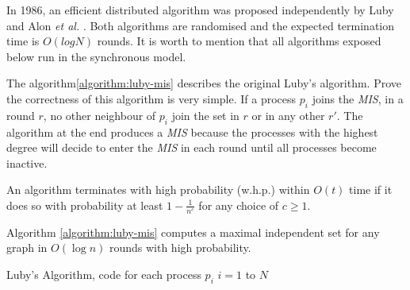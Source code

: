 In 1986, an efficient distributed algorithm was proposed independently by Luby \cite{luby1986simple} and Alon \textit{et al.} \cite{alon1986fast}. Both algorithms are randomised and the expected termination time is $O(log N)$ rounds. It is worth to mention that all algorithms exposed below run in the synchronous model.  

The algorithm\ref{algorithm:luby-mis} describes the original Luby's algorithm. Prove the correctness of this algorithm is very simple. If a process $p_i$ joins the \textit{MIS}, in a round $r$, no other neighbour of $p_i$ join the set in $r$ or in any other $r\prime$. The algorithm at the end produces a \textit{MIS} because the processes with the highest degree will decide to enter the \textit{MIS} in each round until all processes become inactive.

\begin{definition}

An algorithm terminates with high probability (w.h.p.) within $O(t)$ time if it does so with probability at least $1-\frac{1}{n^c}$ for any choice of $c\geq 1$.

\end{definition}

\begin{theorem}

Algorithm \ref{algorithm:luby-mis} computes a maximal independent set for any graph  in $O(\log n)$  rounds with high probability.

\end{theorem}


\begin{algorithm}
 \caption{Luby's Algorithm, code for each process $p_i$ $i = 1$ to $N$}
 \label{algorithm:luby-mis} 

\SetAlgoNoLine
{}
\end{algorithm} 



